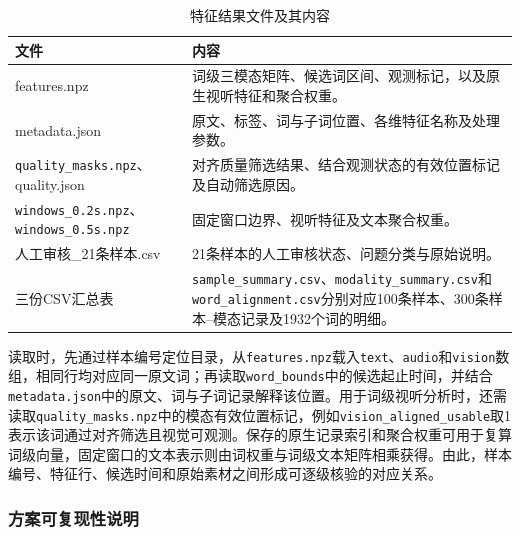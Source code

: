 \begin{table}[H]
    \centering\small
    \caption{特征结果文件及其内容}
    \label{tab:p1_files}
    \setlength{\tabcolsep}{6pt}
    \renewcommand{\arraystretch}{1.12}
    \ifdefined\pOneCompactTableBox\else\newsavebox{\pOneCompactTableBox}\fi
    \begin{lrbox}{\pOneCompactTableBox}
    \begin{tabular}{l>{\raggedright\arraybackslash}p{24em}}
        \toprule
        文件 & 内容\\
        \midrule
        features.npz & 词级三模态矩阵、候选词区间、观测标记，以及原生视听特征和聚合权重。\\
        metadata.json & 原文、标签、词与子词位置、各维特征名称及处理参数。\\
        \nolinkurl{quality_masks.npz}、\newline quality.json & 对齐质量筛选结果、结合观测状态的有效位置标记及自动筛选原因。\\
        \nolinkurl{windows_0.2s.npz}、\newline\nolinkurl{windows_0.5s.npz} & 固定窗口边界、视听特征及文本聚合权重。\\
        人工审核\_21条样本.csv & 21条样本的人工审核状态、问题分类与原始说明。\\
        三份CSV汇总表 & \nolinkurl{sample_summary.csv}、\nolinkurl{modality_summary.csv}和\nolinkurl{word_alignment.csv}分别对应100条样本、300条样本--模态记录及1932个词的明细。\\
        \bottomrule
    \end{tabular}
    \end{lrbox}
    \usebox{\pOneCompactTableBox}
\end{table}

读取时，先通过样本编号定位目录，从\nolinkurl{features.npz}载入\nolinkurl{text}、\nolinkurl{audio}和\nolinkurl{vision}数组，相同行均对应同一原文词；再读取\nolinkurl{word_bounds}中的候选起止时间，并结合\nolinkurl{metadata.json}中的原文、词与子词记录解释该位置。用于词级视听分析时，还需读取\nolinkurl{quality_masks.npz}中的模态有效位置标记，例如\nolinkurl{vision_aligned_usable}取1表示该词通过对齐筛选且视觉可观测。保存的原生记录索引和聚合权重可用于复算词级向量，固定窗口的文本表示则由词权重与词级文本矩阵相乘获得。由此，样本编号、特征行、候选时间和原始素材之间形成可逐级核验的对应关系。

\subsubsection{方案可复现性说明}
\label{sec:p1_reproducibility}

